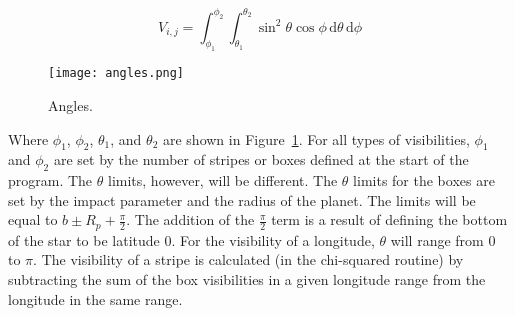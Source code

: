 \documentclass[iop]{emulateapj}
\begin{document}
\begin{equation}
	V_{i,j} = \int_{\phi_1}^{\phi_2} \int_{\theta_1}^{\theta_2} \sin^2{\theta}\cos{\phi}\,\mathrm{d}\theta \, \mathrm{d}\phi
\end{equation}

\begin{figure}[h]
	\centering
	\texttt{[image: angles.png]}
	\caption{Angles.}
	\label{angles}
\end{figure}

Where $\phi_1$, $\phi_2$, $\theta_1$, and $\theta_2$ are shown in Figure~\ref{angles}. For all types of visibilities, $\phi_1$ and $\phi_2$ are set by the number of stripes or boxes defined at the start of the program. The $\theta$ limits, however, will be different.
The $\theta$ limits for the boxes are set by the impact parameter and the radius of the planet. The limits will be equal to $b \pm R_p + \frac{\pi}{2}$. The addition of the $\frac{\pi}{2}$ term is a result of defining the bottom of the star to be latitude 0. For the visibility of a longitude, $\theta$ will range from 0 to $\pi$. The visibility of a stripe is calculated (in the chi-squared routine) by subtracting the sum of the box visibilities in a given longitude range from the longitude in the same range.
\end{document}
